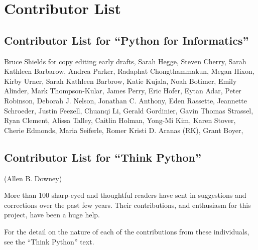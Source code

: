 
\chapter{Contributor List}
\section*{Contributor List for ``Python for Informatics''}

Bruce Shields for copy editing early drafts,
Sarah Hegge,
Steven Cherry,
Sarah Kathleen Barbarow,
Andrea Parker,
Radaphat Chongthammakun,
Megan Hixon,
Kirby Urner,
Sarah Kathleen Barbrow,
Katie Kujala,
Noah Botimer,
Emily Alinder,
Mark Thompson-Kular,
James Perry,
Eric Hofer,
Eytan Adar,
Peter Robinson,
Deborah J. Nelson,
Jonathan C. Anthony,
Eden Rassette,
Jeannette Schroeder,
Justin Feezell,
Chuanqi Li,
Gerald Gordinier,
Gavin Thomas Strassel,
Ryan Clement,
Alissa Talley,
Caitlin Holman,
Yong-Mi Kim,
Karen Stover,
Cherie Edmonds,
Maria Seiferle,
Romer Kristi D. Aranas (RK),
Grant Boyer,


\section*{Contributor List for ``Think Python''}


(Allen B. Downey)

More than 100 sharp-eyed and thoughtful readers have sent in
suggestions and corrections over the past few years.  Their
contributions, and enthusiasm for this project, have been a
huge help.

For the detail on the nature of each of the contributions from
these individuals, see the ``Think Python'' text.

